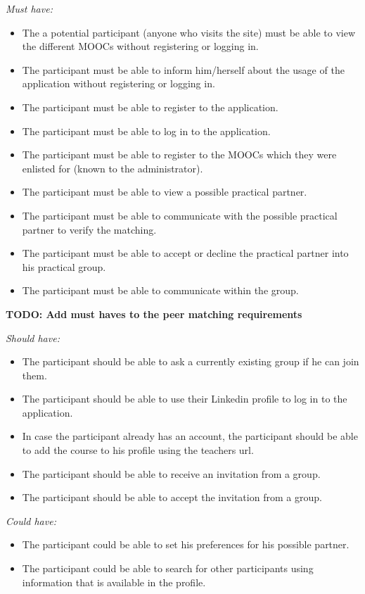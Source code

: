 \documentclass[]{article}
\newcommand{\TODO}[1]{{\color{red}\textbf{TODO: #1}}}
\newcommand{\reqr}[1]{{\noindent\emph{#1:}}}
\begin{document}
\reqr{Must have}
\begin{itemize}
\item The a potential participant (anyone who visits the site) must be able to view the different MOOCs without registering or logging in.
\item The participant must be able to inform him/herself about the usage of the application without registering or logging in.
\item The participant must be able to register to the application.
\item The participant must be able to log in to the application.
\item The participant must be able to register to the MOOCs which they were enlisted for (known to the administrator).
\item The participant must be able to view a possible practical partner.
\item The participant must be able to communicate with the possible practical partner to verify the matching.
\item The participant must be able to accept or decline the practical partner into his practical group.
\item The participant must be able to communicate within the group.
\end{itemize}
\TODO{Add must haves to the peer matching requirements}

\reqr{Should have}
\begin{itemize}
\item The participant should be able to ask a currently existing group if he can join them.
\item The participant should be able to use their Linkedin profile to log in to the application.
\item In case the participant already has an account, the participant should be able to add the course to his profile using the teachers url.
\item The participant should be able to receive an invitation from a group.
\item The participant should be able to accept the invitation from a group.
\end{itemize}

\reqr{Could have}
\begin{itemize}
\item The participant could be able to set his preferences for his possible partner.
\item The participant could be able to search for other participants using information that is available in the profile.
\end{itemize}
\end{document}

